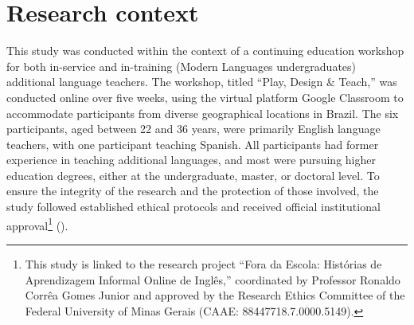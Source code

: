\documentclass[english]{textolivre}
\begin{document}
\section{Research context}\label{sec-normas}
This study was conducted within the context of a continuing education workshop for both in-service and in-training (Modern Languages undergraduates) additional language teachers. The workshop, titled “Play, Design \& Teach,” was conducted online over five weeks, using the virtual platform Google Classroom to accommodate participants from diverse geographical locations in Brazil. The six participants, aged between 22 and 36 years, were primarily English language teachers, with one participant teaching Spanish. All participants had former experience in teaching additional languages, and most were pursuing higher education degrees, either at the undergraduate, master, or doctoral level. To ensure the integrity of the research and the protection of those involved, the study followed established ethical protocols and received official institutional approval\footnote{This study is linked to the research project “Fora da Escola: Histórias de Aprendizagem Informal Online de Inglês,” coordinated by Professor Ronaldo Corrêa Gomes Junior and approved by the Research Ethics Committee of the Federal University of Minas Gerais (CAAE: 88447718.7.0000.5149).} ().
\end{document}
